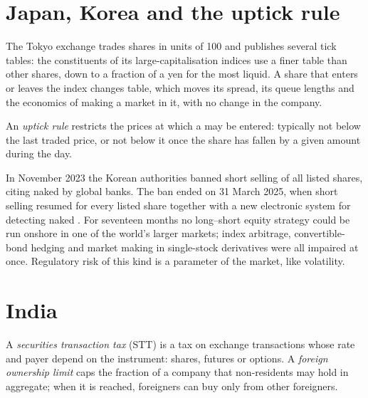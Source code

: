 \section{Japan, Korea and the uptick rule}

The Tokyo exchange trades shares in units of 100 and publishes several tick
tables: the constituents of its large-capitalisation indices use a finer
table than other shares, down to a fraction of a yen for the most liquid. A
share that enters or leaves the index changes table, which moves its spread,
its queue lengths and the economics of making a market in it, with no change
in the company.

\begin{definition}\label{def:m1:asian-and-emerging-equity-markets:uptick}
An \emph{uptick rule} restricts the prices at which a  may be entered: typically not below the last traded price, or not below
it once the share has fallen by a given amount during the day.
\end{definition}

\begin{example}\label{ex:m1:asian-and-emerging-equity-markets:korea}
In November 2023 the Korean authorities banned short selling of all listed
shares, citing naked  by global banks. The ban ended on 31 March
2025, when short selling resumed for every listed share together with a new
electronic system for detecting naked . For seventeen months no
long--short equity strategy could be run onshore in one of the world's
larger markets; index arbitrage, convertible-bond hedging and market making
in single-stock derivatives were all impaired at once. Regulatory risk of
this kind is a parameter of the market, like volatility.
\end{example}

\section{India}

\begin{definition}\label{def:m1:asian-and-emerging-equity-markets:stt}
A \emph{securities transaction tax} (STT)
is a tax on exchange transactions whose rate and payer depend on the
instrument: shares, futures or options. A
\emph{foreign ownership limit} caps the
fraction of a company that non-residents may hold in aggregate; when it is
reached, foreigners can buy only from other foreigners.
\end{definition}

